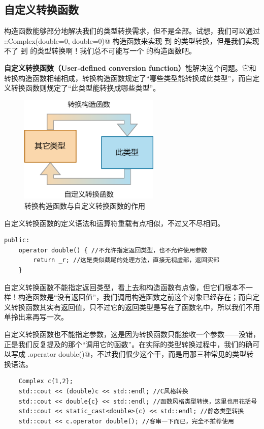 \subsection*{自定义转换函数}
构造函数能够部分地解决我们的类型转换需求，但不是全部。试想，我们可以通过 \lstinline@Complex::Complex(double={0}, double={0})@ 构造函数来实现 \lstinline@double@ 到 \lstinline@Complex@ 的类型转换，但是我们实现不了 \lstinline@Complex@ 到 \lstinline@double@ 的类型转换啊！我们总不可能写一个 \lstinline@double@ 的构造函数吧。\par
\textbf{自定义转换函数（User-defined conversion function）}能解决这个问题。它和转换构造函数相辅相成，转换构造函数规定了``哪些类型能转换成此类型''，而自定义转换函数则规定了``此类型能转换成哪些类型''。
\begin{figure}[htbp]
    \centering
    \includegraphics[width=0.6\textwidth]{../images/generalized_parts/08_type_conversion_between_classes.png}
    \caption{转换构造函数与自定义转换函数的作用}
\end{figure}
自定义转换函数的定义语法和运算符重载有点相似，不过又不尽相同。
\begin{lstlisting}
public:
    operator double() { //不允许指定返回类型，也不允许使用参数
        return _r; //这是类似截尾的处理方法，直接无视虚部，返回实部
    }
\end{lstlisting}
自定义转换函数不能指定返回类型，看上去和构造函数有点像，但它们根本不一样！构造函数是``没有返回值''，我们调用构造函数之前这个对象已经存在；而自定义转换函数其实有返回值，只不过它的返回类型是写在了函数名中，所以我们不用单拎出来再写一次。\par
自定义转换函数也不能指定参数，这是因为转换函数只能接收一个参数——没错，正是我们反复提及的那个``调用它的函数''。在实际的类型转换过程中，我们的确可以写成 \lstinline@c.operator double()@，不过我们很少这个干，而是用那三种常见的类型转换语法。
\begin{lstlisting}
    Complex c{1,2};
    std::cout << (double)c << std::endl; //C风格转换
    std::cout << double{c} << std::endl; //函数风格类型转换，这里也用花括号
    std::cout << static_cast<double>(c) << std::endl; //静态类型转换
    std::cout << c.operator double(); //客串一下而已，完全不推荐使用
\end{lstlisting}\par
